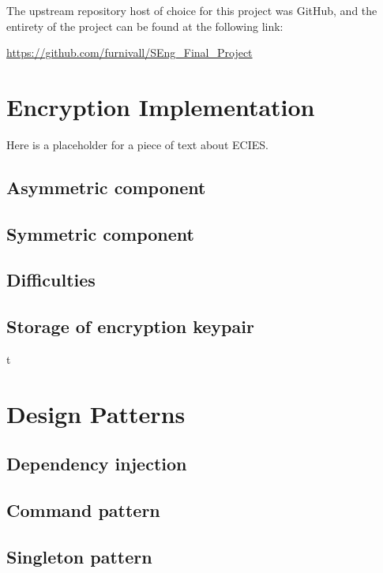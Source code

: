 \documentclass{mproj}
\begin{document}
The upstream repository host of choice for this project was GitHub, and the entirety of the project can be found at the following link: 

\begin{center}
\href{https://github.com/furnivall/SEng_Final_Project}{https://github.com/furnivall/SEng\_Final\_Project}
\end{center}

\section{Encryption Implementation}\label{encryption}
\cite{martinez2010comparison}Here is a placeholder for a piece of text about ECIES.
\subsection{Asymmetric component}\label{asymmetric}

\subsection{Symmetric component}\label{symmetric}

\subsection{Difficulties}\label{encryptionDifficulties}

\subsection{Storage of encryption keypair}
t
\section{Design Patterns}

\subsection{Dependency injection}

\subsection{Command pattern}

\subsection{Singleton pattern}
\end{document}

